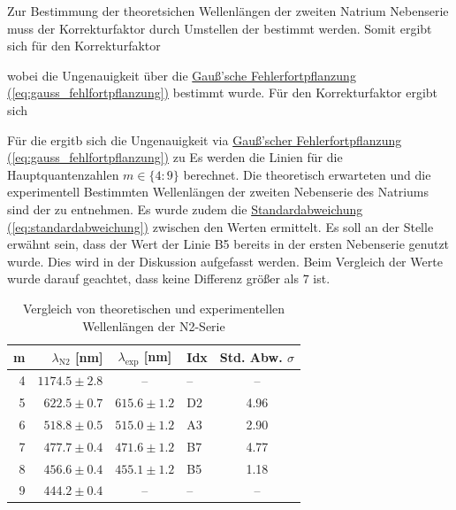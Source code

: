 Zur Bestimmung der theoretsichen Wellenlängen der zweiten Natrium Nebenserie muss der Korrekturfaktor durch Umstellen der  bestimmt werden. Somit ergibt sich für den Korrekturfaktor

wobei die Ungenauigkeit über die \hyperref[eq:gauss_fehlfortpflanzung]{Gauß'sche Fehlerfortpflanzung (\ref*{eq:gauss_fehlfortpflanzung})} bestimmt wurde. 
Für den Korrekturfaktor ergibt sich
\label{eq:res_delta_s_1}

Für die  ergitb sich die Ungenauigkeit via \hyperref[eq:gauss_fehlfortpflanzung]{Gauß'scher Fehlerfortpflanzung (\ref*{eq:gauss_fehlfortpflanzung})} zu
Es werden die Linien für die Hauptquantenzahlen $m \in \{4:9\}$ berechnet. Die theoretisch erwarteten und die experimentell Bestimmten Wellenlängen der zweiten Nebenserie des Natriums sind der  zu entnehmen. Es wurde zudem die \hyperref[eq:standardabweichung]{Standardabweichung (\ref*{eq:standardabweichung})} zwischen den Werten ermittelt.
Es soll an der Stelle erwähnt sein, dass der Wert der Linie B5 bereits in der ersten Nebenserie genutzt wurde. Dies wird in der Diskussion aufgefasst werden. Beim Vergleich der Werte wurde darauf geachtet, dass keine Differenz größer als $7$ ist.

\begin{table}[h!]
    \caption{Vergleich von theoretischen und experimentellen Wellenlängen der N2-Serie}
    \label{tab:n2_lambdas}
    \centering
    \begin{tabular}{r | r c | l || c}
        \toprule
        m & $\lambda_{\text{N2}}$ [nm] & $\lambda_{\text{exp}}$ [nm] & Idx & Std. Abw. $\sigma$ \\
        \midrule
        4 & $1174.5 \pm 2.8$ & -- & -- &  --\\
        5 & $622.5 \pm 0.7$ & $615.6 \pm 1.2$ & D2 & 4.96 \\
        6 & $518.8 \pm 0.5$ & $515.0 \pm 1.2$ & A3 & 2.90 \\
        7 & $477.7 \pm 0.4$ & $471.6 \pm 1.2$ & B7 & 4.77 \\
        8 & $456.6 \pm 0.4$ & $455.1 \pm 1.2$ & B5 & 1.18 \\
        9 & $444.2 \pm 0.4$ & -- & -- &  --\\
        \bottomrule
    \end{tabular}
\end{table}

